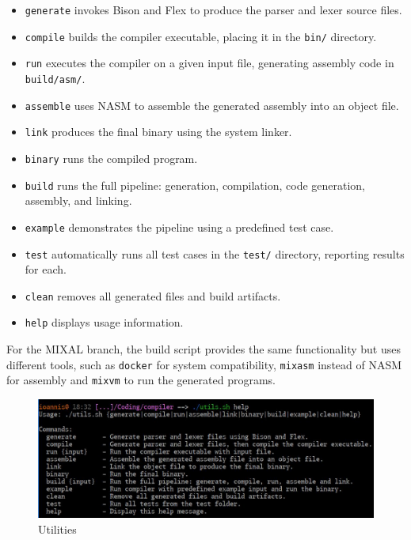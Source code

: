 \documentclass{article}
\begin{document}
    \begin{itemize}
        \item \texttt{generate} invokes Bison and Flex to produce the parser and lexer source files.
        \item \texttt{compile} builds the compiler executable, placing it in the \texttt{bin/} directory.
        \item \texttt{run} executes the compiler on a given input file, generating assembly code in \texttt{build/asm/}.
        \item \texttt{assemble} uses NASM to assemble the generated assembly into an object file.
        \item \texttt{link} produces the final binary using the system linker.
        \item \texttt{binary} runs the compiled program.
        \item \texttt{build} runs the full pipeline: generation, compilation, code generation, assembly, and linking.
        \item \texttt{example} demonstrates the pipeline using a predefined test case.
        \item \texttt{test} automatically runs all test cases in the \texttt{test/} directory, reporting results for each.
        \item \texttt{clean} removes all generated files and build artifacts.
        \item \texttt{help} displays usage information.
    \end{itemize}

    For the MIXAL branch, the build script provides the same functionality but uses different tools, such as \texttt{docker} for system compatibility, \texttt{mixasm} instead of NASM for assembly and \texttt{mixvm} to run the generated programs.
    
    \begin{figure} [h]
        \centering
        \includegraphics[width=1\linewidth]{assets/utils.png}
        \caption{Utilities}
        \label{fig:enter-label}
    \end{figure}
    
\end{document}
